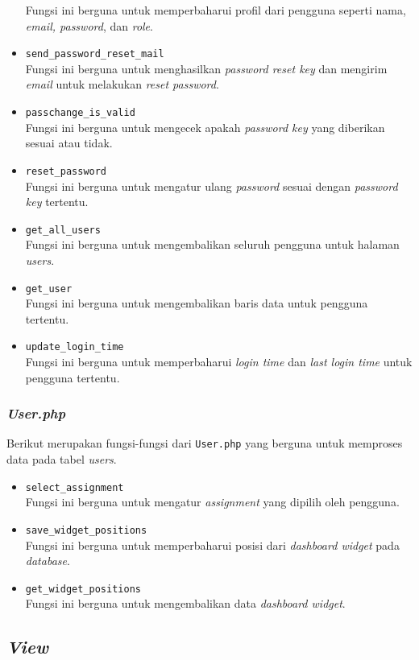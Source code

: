 \begin{itemize}
	Fungsi ini berguna untuk memperbaharui profil dari pengguna seperti nama, \textit{email, password}, dan \textit{role}.
	\item \texttt{send\_password\_reset\_mail}\\
	Fungsi ini berguna untuk menghasilkan \textit{password reset key} dan mengirim \textit{email} untuk melakukan \textit{reset password}.
	\item \texttt{passchange\_is\_valid}\\
	Fungsi ini berguna untuk mengecek apakah \textit{password key} yang diberikan sesuai atau tidak.
	\item \texttt{reset\_password}\\
	Fungsi ini berguna untuk mengatur ulang \textit{password} sesuai dengan \textit{password key} tertentu.
	\item \texttt{get\_all\_users}\\
	Fungsi ini berguna untuk mengembalikan seluruh pengguna untuk halaman \textit{users}.
	\item \texttt{get\_user}\\
	Fungsi ini berguna untuk mengembalikan baris data untuk pengguna tertentu.
	\item \texttt{update\_login\_time}\\
	Fungsi ini berguna untuk memperbaharui \textit{login time} dan \textit{last login time} untuk pengguna tertentu.
\end{itemize}
\subsubsection{\textit{User.php}}
Berikut merupakan fungsi-fungsi dari \texttt{User.php} yang berguna untuk memproses data pada tabel \textit{users}.
\begin{itemize}
	\item \texttt{select\_assignment}\\
	Fungsi ini berguna untuk mengatur \textit{assignment} yang dipilih oleh pengguna.
	\item \texttt{save\_widget\_positions}\\
	Fungsi ini berguna untuk memperbaharui posisi dari \textit{dashboard widget} pada \textit{database}.
	\item \texttt{get\_widget\_positions}\\
	Fungsi ini berguna untuk mengembalikan data \textit{dashboard widget}.
\end{itemize}

\subsection{\textit{View}}
